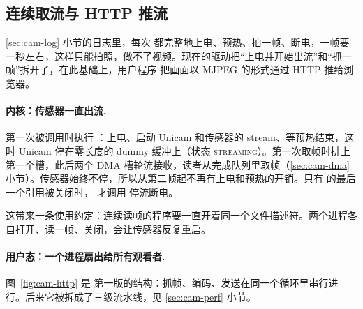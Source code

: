 \subsection{连续取流与 HTTP 推流}
\label{sec:cam-http}

\ref{sec:cam-log} 小节的日志里，每次  都完整地上电、预热、拍一帧、断电，一帧要一秒左右，这样只能拍照，做不了视频。现在的驱动把“上电并开始出流”和“抓一帧”拆开了，在此基础上，用户程序  把画面以 MJPEG 的形式通过 HTTP 推给浏览器。

\paragraph{内核：传感器一直出流.}  第一次被调用时执行 ：上电、启动 Unicam 和传感器的 stream、等预热结束，这时 Unicam 停在零长度的 dummy 缓冲上（状态 \textsc{streaming}）。第一次取帧时排上第一个槽，此后两个 DMA 槽轮流接收，读者从完成队列里取帧（\ref{sec:cam-dma} 小节）。传感器始终不停，所以从第二帧起不再有上电和预热的开销。只有  的最后一个引用被关闭时， 才调用  停流断电。

这带来一条使用约定：连续读帧的程序要一直开着同一个文件描述符。两个进程各自打开、读一帧、关闭，会让传感器反复重启。

\paragraph{用户态：一个进程扇出给所有观看者.} 图~\ref{fig:cam-http} 是  第一版的结构：抓帧、编码、发送在同一个循环里串行进行。后来它被拆成了三级流水线，见 \ref{sec:cam-perf} 小节。

